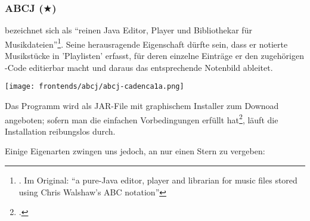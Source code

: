 %
%
%



\subsubsection{ABCJ ($\bigstar$)}

 bezeichnet sich als \enquote{reinen Java Editor, Player und
Bibliothekar für Musikdateien}\footnote{\cite[vgl.][\nopage wp.]{Spencer2019a}.
Im Original: \enquote{a pure-Java editor, player and librarian for music files
stored using Chris Walshaw's ABC notation}}. Seine herausragende Eigenschaft
dürfte sein, dass er  notierte Musikstücke in 'Playlisten' erfasst, für
deren einzelne Einträge er den zugehörigen -Code editierbar macht und
daraus  das entsprechende Notenbild ableitet.

\begin{center}
\texttt{[image: frontends/abcj/abcj-cadenca1a.png]}
\end{center}

Das Programm wird als JAR-File mit graphischem Installer zum Downoad angeboten;
sofern man die einfachen Vorbedingungen erfüllt hat\footcite[vgl.][\nopage
wp]{Spencer2019a}, läuft die Installation reibungslos durch.

Einige Eigenarten zwingen uns jedoch, an  nur einen Stern zu vergeben:

